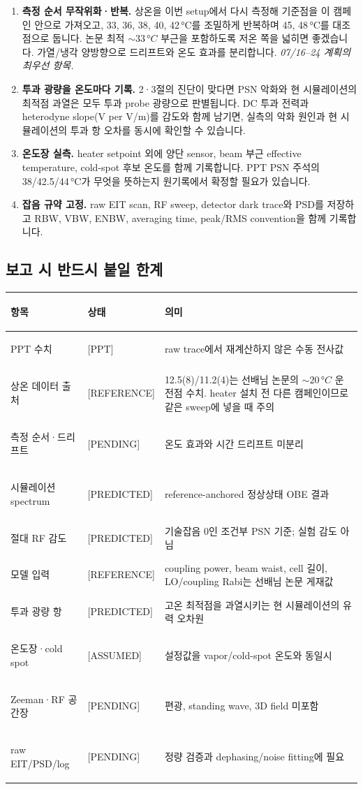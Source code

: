 \documentclass[10pt,a4paper]{article}
\newcommand{\Status}[1]{\textsf{\footnotesize[#1]}}
\providecommand{\PaperPSNOptimumC}{33}
\begin{document}
\begin{enumerate}
  \setlength{\itemsep}{0.22em}
  \item \textbf{측정 순서 무작위화·반복.} 상온을 이번 setup에서 다시 측정해 기준점을 이 캠페인 안으로
        가져오고, 33, 36, 38, 40, 42\,°C를 조밀하게 반복하며 45, 48\,°C를 대조점으로 둡니다.
        논문 최적 \(\sim\PaperPSNOptimumC\,°C\) 부근을 포함하도록 저온 쪽을 넓히면 좋겠습니다.
        가열/냉각 양방향으로 드리프트와 온도 효과를 분리합니다. \emph{07/16--24 계획의 최우선 항목.}
  \item \textbf{투과 광량을 온도마다 기록.} 2·3절의 진단이 맞다면 PSN 악화와 현 시뮬레이션의 최적점 과열은
        모두 투과 probe 광량으로 판별됩니다. DC 투과 전력과 heterodyne slope(V per V/m)를 감도와
        함께 남기면, 실측의 악화 원인과 현 시뮬레이션의 투과 항 오차를 동시에 확인할 수 있습니다.
  \item \textbf{온도장 실측.} heater setpoint 외에 양단 sensor, beam 부근 effective temperature,
        cold-spot 후보 온도를 함께 기록합니다. PPT PSN 주석의 38/42.5/44\,°C가 무엇을 뜻하는지
        원기록에서 확정할 필요가 있습니다.
  \item \textbf{잡음 규약 고정.} raw EIT scan, RF sweep, detector dark trace와 PSD를 저장하고
        RBW, VBW, ENBW, averaging time, peak/RMS convention을 함께 기록합니다.
\end{enumerate}

\subsection*{보고 시 반드시 붙일 한계}

\begin{tabularx}{\textwidth}{>{\bfseries\raggedright\arraybackslash}p{3.35cm}p{2.05cm}X}
\toprule
항목 & 상태 & 의미\\
\midrule
PPT 수치 & \Status{PPT} & raw trace에서 재계산하지 않은 수동 전사값\\
상온 데이터 출처 & \Status{REFERENCE} & 12.5(8)/11.2(4)는 선배님 논문의 \(\sim20\,°C\) 운전점 수치.
  heater 설치 전 다른 캠페인이므로 같은 sweep에 넣을 때 주의\\
측정 순서·드리프트 & \Status{PENDING} & 온도 효과와 시간 드리프트 미분리\\
시뮬레이션 spectrum & \Status{PREDICTED} & reference-anchored 정상상태 OBE 결과\\
절대 RF 감도 & \Status{PREDICTED} & 기술잡음 0인 조건부 PSN 기준; 실험 감도 아님\\
모델 입력 & \Status{REFERENCE} & coupling power, beam waist, cell 길이, LO/coupling Rabi는
  선배님 논문 게재값\\
투과 광량 항 & \Status{PREDICTED} & 고온 최적점을 과열시키는 현 시뮬레이션의 유력 오차원\\
온도장·cold spot & \Status{ASSUMED} & 설정값을 vapor/cold-spot 온도와 동일시\\
Zeeman·RF 공간장 & \Status{PENDING} & 편광, standing wave, 3D field 미포함\\
raw EIT/PSD/log & \Status{PENDING} & 정량 검증과 dephasing/noise fitting에 필요\\
\bottomrule
\end{tabularx}
\end{document}
